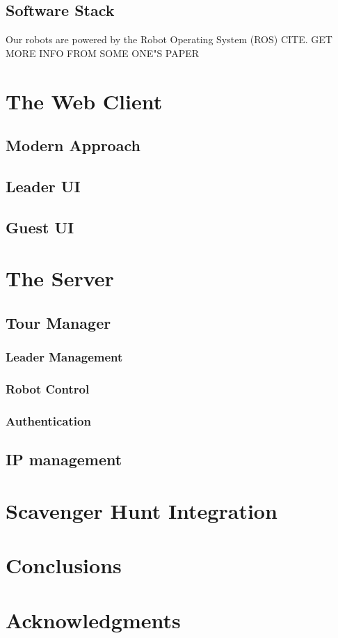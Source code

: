 \documentclass{sig-alternate-05-2015}
\begin{document}
\subsection{Software Stack}

Our robots are powered by the Robot Operating System (ROS) {CITE}. {GET MORE
INFO FROM SOME ONE"S PAPER}

\section{The Web Client}

\subsection{Modern Approach}

\subsection{Leader UI}

\subsection{Guest UI}

\section{The Server}

\subsection{Tour Manager}

\subsubsection{Leader Management}

\subsubsection{Robot Control}

\subsubsection{Authentication}

\subsection{IP management}

\section{Scavenger Hunt Integration}

\section{Conclusions}

\section{Acknowledgments}


\end{document}
